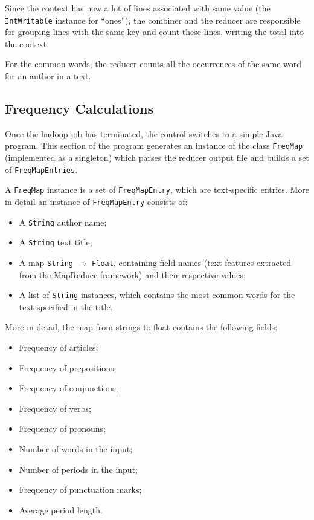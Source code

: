 \documentclass[a4paper,11pt, twoside]{article}
\begin{document}
		Since the context has now a lot of lines associated with same value (the \lstinline|IntWritable| instance for ``ones''), the combiner and the reducer are responsible for grouping lines with the same key and count these lines, writing the total into the context.
		
		For the common words, the reducer counts all the occurrences of the same word for an author in a text.
	
	\subsection{Frequency Calculations}
		Once the hadoop job has terminated, the control switches to a simple Java program. This section of the program generates an instance of the class \lstinline|FreqMap| (implemented as a singleton) which parses the reducer output file and builds a set of \lstinline|FreqMapEntries|.
		
		\noindent
		A \lstinline|FreqMap| instance is a set of \lstinline|FreqMapEntry|, which are text-specific entries. More in detail an instance of \lstinline|FreqMapEntry| consists of: \begin{itemize}
			\item A \lstinline|String| author name;
			\item A \lstinline|String| text title;
			\item A map \lstinline|String| $\to$ \lstinline|Float|, containing field names (text features extracted from the MapReduce framework) and their respective values;
			\item  A list of \lstinline|String| instances, which contains the most common words for the text specified in the title.
		\end{itemize}

		\noindent
		More in detail, the map from strings to float contains the following fields: \begin{itemize}
			\item Frequency of articles;
			\item Frequency of prepositions;
			\item Frequency of conjunctions;
			\item Frequency of verbs;
			\item Frequency of pronouns;
			\item Number of words in the input;
			\item Number of periods in the input;
			\item Frequency of punctuation marks;
			\item Average period length.
		\end{itemize}
\end{document}

